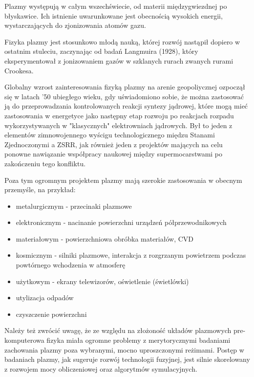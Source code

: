     Plazmy występują w całym wszechświecie, od materii międzygwiezdnej po błyskawice.
    Ich istnienie uwarunkowane jest obecnością wysokich energii, wystarczających do zjonizowania atomów gazu.

    Fizyka plazmy jest stosunkowo młodą nauką, której rozwój nastąpił dopiero w ostatnim stuleciu, zaczynając od badań
    Langmuira (1928), który eksperymentował z jonizowaniem gazów w szklanych rurach zwanych rurami Crookesa. %
    
    Globalny wzrost zainteresowania fizyką plazmy na arenie geopoliycznej ozpoczął się w latach '50 ubiegłego wieku, %
    gdy uświadomiono sobie, że można zastosować ją do przeprowadzania kontrolowanych reakcji syntezy jądrowej, %
    które mogą mieć zastosowania w energetyce jako następny etap rozwoju po reakcjach rozpadu wykorzystywanych
    w "klasycznych" elektrowniach jądrowych. Był to jeden z elementów zimnowojennego wyścigu technologicznego
    międzu Stanami Zjednoczonymi a ZSRR, %
    jak również jeden z projektów mających na celu ponowne nawiązanie współpracy naukowej między supermocarstwami
    po zakończeniu tego konfliktu. %

    Poza tym ogromnym projektem plazmy mają szerokie zastosowania w obecnym przemyśle, na przykład:
    \begin{itemize}
        \item metalurgicznym - przecinaki plazmowe %
        \item elektronicznym - nacinanie powierzchni urządzeń półprzewodnikowych %
        \item materiałowym - powierzchniowa obróbka materiałów, %
              CVD %
        \item kosmicznym - silniki plazmowe, interakcja z rozgrzanym powietrzem podczas powtórnego wchodzenia 
              w atmosferę %
        \item użytkowym - ekrany telewizorów, oświetlenie (świetlówki)
        \item utylizacja odpadów %
        \item czyszczenie powierzchni %
    \end{itemize}

    Należy też zwrócić uwagę, że ze względu na złożoność układów plazmowych pre-komputerowa fizyka miała ogromne
    problemy z merytorycznymi badaniami zachowania plazmy poza wybranymi, mocno uproszczonymi reżimami. Postęp w badaniach
    plazmy, jak sugeruje rozwój technologii fuzyjnej, %
    jest silnie skorelowany %
    z rozwojem mocy obliczeniowej oraz algorytmów symulacyjnych.

